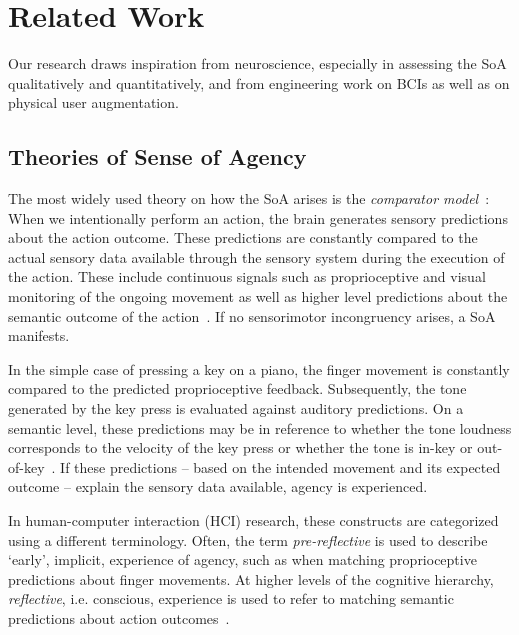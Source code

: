 \section{Related Work}
Our research draws inspiration from neuroscience, especially in assessing the SoA qualitatively and quantitatively, and from engineering work on BCIs as well as on physical user augmentation.

\subsection{Theories of Sense of Agency}
The most widely used theory on how the SoA arises is the \textit{comparator model}~\cite{Blakemore2002-dj, Frith2000-ch, Frith2006-sc}: When we intentionally perform an action, the brain generates sensory predictions about the action outcome. These predictions are constantly compared to the actual sensory data available through the sensory system during the execution of the action. These include continuous signals such as proprioceptive and visual monitoring of the ongoing movement as well as higher level predictions about the semantic outcome of the action~\cite{Clark2013-ah, Haggard2003-ff, Haggard2017-uv}. If no sensorimotor incongruency arises, a SoA manifests. 

In the simple case of pressing a key on a piano, the finger movement is constantly compared to the predicted proprioceptive feedback. Subsequently, the tone generated by the key press is evaluated against auditory predictions. On a semantic level, these predictions may be in reference to whether the tone loudness corresponds to the velocity of the key press or whether the tone is in-key or out-of-key~\cite{Pangratz2023-ew}. If these predictions -- based on the intended movement and its expected outcome -- explain the sensory data available, agency is experienced.

In human-computer interaction (HCI) research, these constructs are categorized using a different terminology. Often, the term \textit{pre-reflective} is used to describe `early', implicit, experience of agency, such as when matching proprioceptive predictions about finger movements. At higher levels of the cognitive hierarchy, \textit{reflective}, i.e. conscious, experience is used to refer to matching semantic predictions about action outcomes~\cite{Danry2022-xk, Cornelio2022-aq}. 

